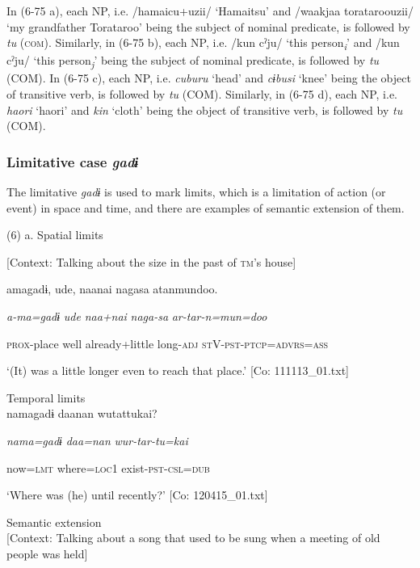 In (6-75 a), each NP, i.e. /hamaicu+uzii/ ‘Hamaitsu’ and /waakjaa torataroouzii/ ‘my grandfather Torataroo’ being the subject of nominal predicate, is followed by \textit{tu} (\textsc{com}). Similarly, in (6-75 b), each NP, i.e. /kun cˀju/ ‘this person\textit{\textsubscript{i}}’ and /kun cˀju/ ‘this person\textit{\textsubscript{j}}’ being the subject of nominal predicate, is followed by \textit{tu} (COM). In (6-75 c), each NP, i.e. \textit{cuburu} ‘head’ and \textit{cɨbusi} ‘knee’ being the object of transitive verb, is followed by \textit{tu} (COM). Similarly, in (6-75 d), each NP, i.e. \textit{haori} ‘haori’ and \textit{kin} ‘cloth’ being the object of transitive verb, is followed by \textit{tu} (COM).

\subsubsection{ Limitative case \textit{gadɨ}}

The limitative \textit{gadɨ} is used to mark limits, which is a limitation of action (or event) in space and time, and there are examples of semantic extension of them.

(6)  a. Spatial limits

  [Context: Talking about the size in the past of \textsc{tm}’s house]

{\TM}
\gll amagadɨ,  ude,  naanai  nagasa  atanmundoo.

    \textit{a-ma=gadɨ}  \textit{ude}  \textit{naa+nai}  \textit{naga-sa}  \textit{ar-tar-n=mun=doo}

    \textsc{prox}-place  well  already+little  long-\textsc{adj}  \textsc{st}V-\textsc{pst}-\textsc{ptcp}=\textsc{advrs}=\textsc{ass}

\glt    ‘(It) was a little longer even to reach that place.’ [Co: 111113\_01.txt]
\z

\ex Temporal limits\\

{\TM}
\gll namagadɨ  daanan  wutattukai?

    \textit{nama=gadɨ}  \textit{daa=nan}  \textit{wur-tar-tu=kai}

    now=\textsc{lmt}  where=\textsc{loc}1  exist-\textsc{pst}-\textsc{csl}=\textsc{dub}

\glt    ‘Where was (he) until recently?’ [Co: 120415\_01.txt]
\z

\ex Semantic extension\\

  [Context: Talking about a song that used to be sung when a meeting of old people was held]

